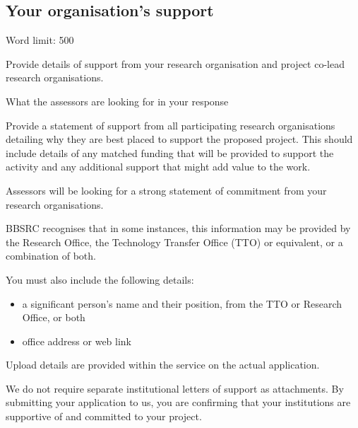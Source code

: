 \documentclass[12in]{article}
\begin{document}
\pagebreak

\subsection{Your organisation’s support}

{\color{red}

Word limit: 500

Provide details of support from your research organisation and project co-lead research organisations.

What the assessors are looking for in your response

Provide a statement of support from all participating research organisations
detailing why they are best placed to support the proposed project. This should
include details of any matched funding that will be provided to support the
activity and any additional support that might add value to the work.

Assessors will be looking for a strong statement of commitment from your research organisations.

BBSRC recognises that in some instances, this information may be provided by the Research Office, the Technology Transfer Office (TTO) or equivalent, or a combination of both.

You must also include the following details:

\begin{itemize}

	\item a significant person’s name and their position, from the TTO or
Research Office, or both

	\item office address or web link

\end{itemize}

Upload details are provided within the service on the actual application.

We do not require separate institutional letters of support as attachments. By
submitting your application to us, you are confirming that your institutions
are supportive of and committed to your project.

}



\end{document}
